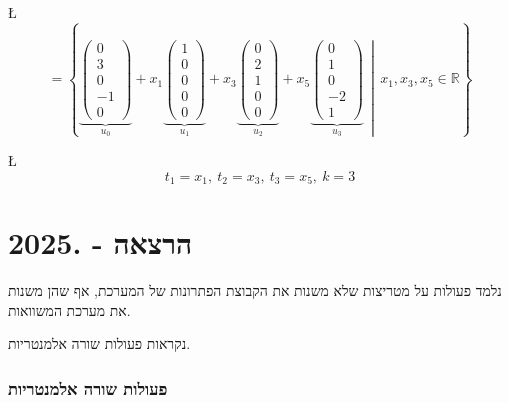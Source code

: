 \documentclass[english,hebrew]{article}
\begin{document}
\L{%
\[
=\left\{ \underbrace{\begin{pmatrix}0\\
3\\
0\\
-1\\
0
\end{pmatrix}}_{u_{0}}+x_{1}\underbrace{\begin{pmatrix}1\\
0\\
0\\
0\\
0
\end{pmatrix}}_{u_{1}}+x_{3}\underbrace{\begin{pmatrix}0\\
2\\
1\\
0\\
0
\end{pmatrix}}_{u_{2}}+x_{5}\underbrace{\begin{pmatrix}0\\
1\\
0\\
-2\\
1
\end{pmatrix}}_{u_{3}}\,\middle|\,x_{1},x_{3},x_{5}\in\mathbb{R}\right\} 
\]
}%

\L{%
\[
t_{1}=x_{1},\ t_{2}=x_{3},\ t_{3}=x_{5},\ k=3
\]
}%

\newpage{}

\noindent{}

\part{הרצאה {\endL} - {.2025\endL}}

נלמד פעולות על מטריצות שלא משנות את הקבוצת הפתרונות של המערכת, אף
שהן משנות את מערכת המשוואות.

נקראות פעולות שורה אלמנטריות.

\section{פעולות שורה אלמנטריות}
\end{document}
